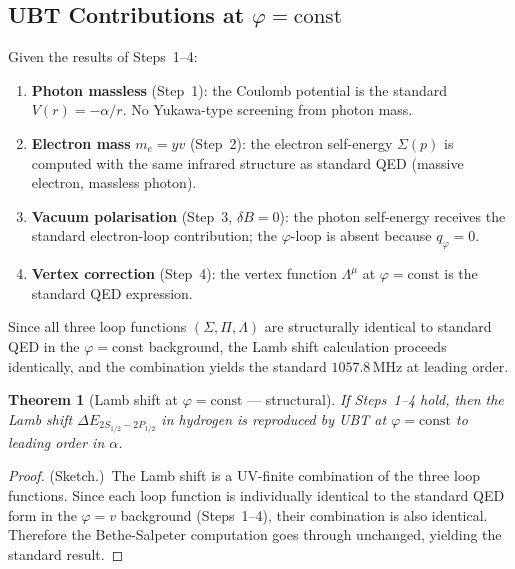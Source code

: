 \documentclass[12pt]{article}
\newtheorem{theorem}{Theorem}[section]
\theoremstyle{definition}
\theoremstyle{remark}
\begin{document}
\subsection{UBT Contributions at $\varphi = \mathrm{const}$}

Given the results of Steps~1--4:

\begin{enumerate}
  \item \textbf{Photon massless} (Step~1): the Coulomb potential is the standard
        $V(r) = -\alpha/r$.  No Yukawa-type screening from photon mass.

  \item \textbf{Electron mass} $m_e = yv$ (Step~2): the electron self-energy
        $\Sigma(p)$ is computed with the same infrared structure as standard QED
        (massive electron, massless photon).

  \item \textbf{Vacuum polarisation} (Step~3, $\delta B = 0$): the photon self-energy
        receives the standard electron-loop contribution; the $\varphi$-loop is absent
        because $q_\varphi = 0$.

  \item \textbf{Vertex correction} (Step~4): the vertex function $\Lambda^\mu$ at
        $\varphi = \mathrm{const}$ is the standard QED expression.
\end{enumerate}

Since all three loop functions $(\Sigma, \Pi, \Lambda)$ are structurally identical to
standard QED in the $\varphi = \mathrm{const}$ background, the Lamb shift calculation
proceeds identically, and the combination yields the standard $1057.8\,\mathrm{MHz}$
at leading order.

\begin{theorem}[Lamb shift at $\varphi = \mathrm{const}$ — structural]
  If Steps~1--4 hold, then the Lamb shift $\Delta E_{2S_{1/2}-2P_{1/2}}$ in hydrogen
  is reproduced by UBT at $\varphi = \mathrm{const}$ to leading order in $\alpha$.
\end{theorem}

\begin{proof}
  (Sketch.)\ The Lamb shift is a UV-finite combination of the three loop functions.
  Since each loop function is individually identical to the standard QED form in the
  $\varphi = v$ background (Steps~1--4), their combination is also identical.  Therefore
  the Bethe-Salpeter computation goes through unchanged, yielding the standard result.
\end{proof}
\end{document}
